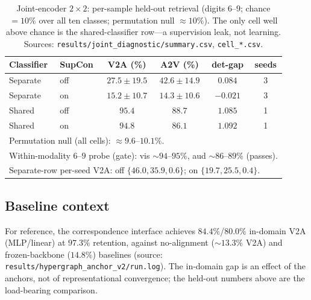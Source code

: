 \documentclass[conference]{IEEEtran}
\begin{document}
\begin{table}[t]
\centering
\caption{Joint-encoder $2{\times}2$: per-sample held-out retrieval
(digits $6$--$9$; chance $=10\%$ over all ten classes; permutation null
$\approx10\%$). The only cell well above chance is the shared-classifier
row---a supervision leak, not learning. Sources:
\texttt{results/joint\_diagnostic/summary.csv}, \texttt{cell\_*.csv}.}
\label{tab:2x2}
\begin{tabular}{llcccc}
\toprule
Classifier & SupCon & V2A (\%) & A2V (\%) & det-gap & seeds \\
\midrule
Separate & off & $27.5 \pm 19.5$ & $42.6 \pm 14.9$ & $0.084$ & 3 \\
Separate & on  & $15.2 \pm 10.7$ & $14.3 \pm 10.6$ & $-0.021$ & 3 \\
Shared   & off & $95.4$          & $88.7$          & $1.085$ & 1 \\
Shared   & on  & $94.8$          & $86.1$          & $1.092$ & 1 \\
\midrule
\multicolumn{6}{l}{Permutation null (all cells): $\approx9.6$--$10.1\%$.} \\
\multicolumn{6}{l}{Within-modality $6$--$9$ probe (gate): vis $\sim94$--$95\%$, aud $\sim86$--$89\%$ (passes).} \\
\multicolumn{6}{l}{Separate-row per-seed V2A: off $\{46.0, 35.9, 0.6\}$; on $\{19.7, 25.5, 0.4\}$.} \\
\bottomrule
\end{tabular}
\end{table}

\subsection{Baseline context}
For reference, the correspondence interface achieves $84.4\%$/$80.0\%$
in-domain V2A (MLP/linear) at $97.3\%$ retention, against
no-alignment ($\sim13.3\%$ V2A) and frozen-backbone ($14.8\%$) baselines
(source: \texttt{results/hypergraph\_anchor\_v2/run.log}). The in-domain
gap is an effect of the anchors, not of representational convergence; the
held-out numbers above are the load-bearing comparison.
\end{document}
